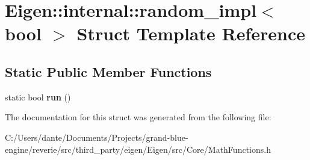 \hypertarget{struct_eigen_1_1internal_1_1random__impl_3_01bool_01_4}{}\section{Eigen\+::internal\+::random\+\_\+impl$<$ bool $>$ Struct Template Reference}
\label{struct_eigen_1_1internal_1_1random__impl_3_01bool_01_4}
\subsection*{Static Public Member Functions}
\begin{DoxyCompactItemize}
\item 
\mbox{\label{struct_eigen_1_1internal_1_1random__impl_3_01bool_01_4_af795aefce4668a5baad88b325dca0da4}} 
static bool {\bfseries run} ()
\end{DoxyCompactItemize}


The documentation for this struct was generated from the following file\+:\begin{DoxyCompactItemize}
\item 
C\+:/\+Users/dante/\+Documents/\+Projects/grand-\/blue-\/engine/reverie/src/third\+\_\+party/eigen/\+Eigen/src/\+Core/Math\+Functions.\+h\end{DoxyCompactItemize}
